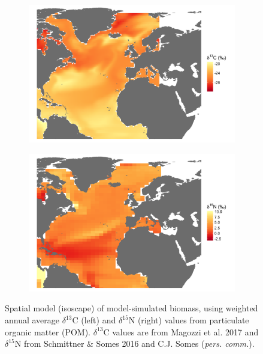 \documentclass[a4paper,10pt]{article}
\begin{document}
\begin{figure}[!htbp]
    \centering
    \begin{subfigure}[t]{0.45\textwidth}
        \centering
        \includegraphics[width=\linewidth]{figures/Figure-S3-plankton-d13C-map.png} 
    \end{subfigure}
    \hfill
    \begin{subfigure}[t]{0.45\textwidth}
        \centering
        \includegraphics[width=\linewidth]{figures/Figure-S3-plankton-d15N-map.png} 
    \end{subfigure}
    \caption{Spatial model (isoscape) of model-simulated biomass, using weighted annual average $\delta^{13}$C (left) and $\delta^{15}$N (right) values from particulate organic matter (POM). $\delta^{13}$C values are from Magozzi et al. 2017\cite{magozzi2017using} and $\delta^{15}$N from Schmittner \& Somes 2016\cite{schmittner2016complementary} and C.J. Somes (\textit{pers. comm.}).} 
    \label{figs3}
\end{figure}
\end{document}
